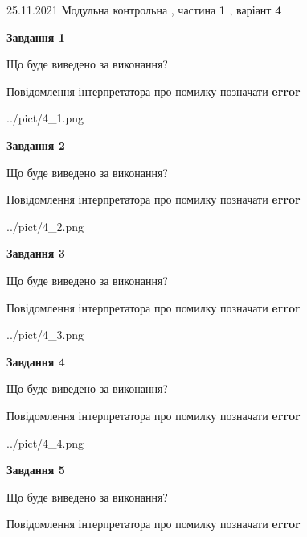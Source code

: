 \documentclass[10pt, ukrainian]{article}
\begin{document}
{25.11.2021 Модульна контрольна , частина \textbf { 1 }, варіант  \No \textbf { 4 }\par}
{
\begin {large}

{\begin {center}\textbf{Завдання 1}\end {center}}\par
Що буде виведено за виконання? \par
Повідомлення інтерпретатора про помилку позначати \textbf{error}

\begin{center}
	{../pict/4_1.png}
\end{center}
\newpage

{\begin {center}\textbf{Завдання 2}\end {center}}\par
Що буде виведено за виконання? \par
Повідомлення інтерпретатора про помилку позначати \textbf{error}

\begin{center}
	{../pict/4_2.png}
\end{center}
\newpage

{\begin {center}\textbf{Завдання 3}\end {center}}\par
Що буде виведено за виконання? \par
Повідомлення інтерпретатора про помилку позначати \textbf{error}

\begin{center}
	{../pict/4_3.png}
\end{center}
\newpage

{\begin {center}\textbf{Завдання 4}\end {center}}\par
Що буде виведено за виконання? \par
Повідомлення інтерпретатора про помилку позначати \textbf{error}

\begin{center}
	{../pict/4_4.png}
\end{center}
\newpage

{\begin {center}\textbf{Завдання 5}\end {center}}\par
Що буде виведено за виконання? \par
Повідомлення інтерпретатора про помилку позначати \textbf{error}


\end{large}}
\end{document}
